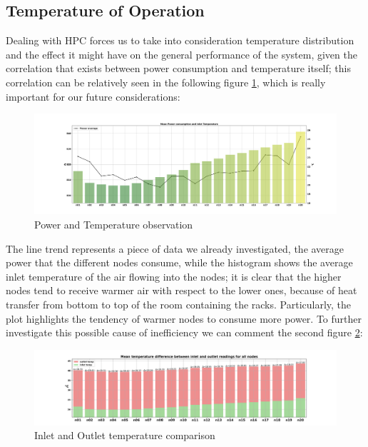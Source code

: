 \subsection{Temperature of Operation}
Dealing with HPC forces us to take into consideration temperature distribution and the effect it might have on the general performance of the system, given the correlation that exists between power consumption and temperature itself; this correlation can be relatively seen in the following figure \ref{fig:PWR_TEMP}, which is really important for our future considerations:

\begin{figure}[H]
    \centering
    \includegraphics[width=1\textwidth]{Figures/PWR_TEMPin_nodes_mean_plot.png}
    \caption{Power and Temperature observation}
    \label{fig:PWR_TEMP}
\end{figure}

The line trend represents a piece of data we already investigated, the average power that the different nodes consume, while the histogram shows the average inlet temperature of the air flowing into the nodes;
it is clear that the higher nodes tend to receive warmer air with respect to the lower ones, because of heat transfer from bottom to top of the room containing the racks.
Particularly, the plot highlights the tendency of warmer nodes to consume more power.
To further investigate this possible cause of inefficiency we can comment the second figure \ref{fig:TEMP}:

\begin{figure}[H]
    \centering
    \includegraphics[width=1\textwidth]{Figures/TEMP_difference_plot.png}
    \caption{Inlet and Outlet temperature comparison}
    \label{fig:TEMP}
\end{figure}


